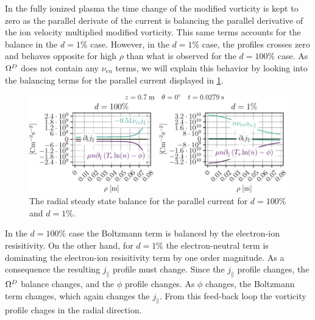 %
In the fully ionized plasma the time change of the modified vorticity is kept to zero as the parallel derivate of the current is balancing the parallel derivative of the ion velocity multiplied modified vorticity.
This same terms accounts for the balance in the $d=1\%$ case.
However, in the $d=1\%$ case, the profiles crosses zero and behaves opposite for high $\rho$ than what is observed for the $d=100\%$ case.
As $\Omega^D$ does not contain any $\nu_{en}$ terms, we will explain this behavior by looking into the balancing terms for the parallel current displayed in \cref{fig:nnScanJParRad}.
%
\begin{figure}[htb]
    \centering
    \includegraphics{fig/results/neutral/jParBalanceNnCompareRad}
    \caption{The radial steady state balance for the parallel current for $d=100\%$ and $d=1\%$.}
    \label{fig:nnScanJParRad}
\end{figure}
%
In the $d=100\%$ case the Boltzmann term is balanced by the electron-ion resisitivity.
On the other hand, for $d=1\%$ the electron-neutral term is dominating the electron-ion resisitivity term by one order magnitude.
As a consequence the resulting $j_\|$ profile must change.
Since the $j_\|$ profile changes, the $\Omega^D$ balance changes, and the $\phi$ profile changes.
As $\phi$ changes, the Boltzmann term changes, which again changes the $j_\|$.
From this feed-back loop the vorticity profile chages in the radial direction.

